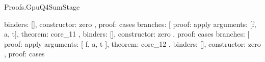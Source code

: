 \begin{lexlean}{Proofs.GpuQ4SumStage}
\begin{semanticmodule}
{{{{{{{{{{{{{{{{{{{{{{{                                                                    binders: [],
                                                                    constructor: zero
                                                                  },
                                                                  {
                                                                    proof: cases{
                                                                      branches: [
                                                                        {
                                                                          proof: apply{
                                                                            arguments: [f, a, t],
                                                                            theorem: core_11
                                                                          },
                                                                          binders: [],
                                                                          constructor: zero
                                                                        },
                                                                        {
                                                                          proof: cases{
                                                                            branches: [
                                                                              {
                                                                                proof: apply{
                                                                                  arguments: [
                                                                                    f,
                                                                                    a,
                                                                                    t
                                                                                  ],
                                                                                  theorem: core_12
                                                                                },
                                                                                binders: [],
                                                                                constructor: zero
                                                                              },
                                                                              {
                                                                                proof: cases{
}}}}}}}}}}}}}}}}}}}}}}}}}}}}
\end{semanticmodule}
\end{lexlean}
